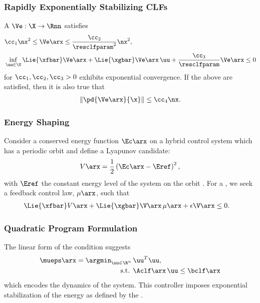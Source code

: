 \begin{frame}[t]
  \frametitle{Rapidly Exponentially Stabilizing CLFs}
  A 
  $\Ve : \X \to \Rnn$ satisfies
  \begin{align*}
    &\cc_{1} \nx^{2} \leq \Ve\arx \leq \frac{\cc_{2}}{\resclfparam^{2}} \nx^{2},\\
    &\inf_{\uu \in \U} \Lie{\xfbar}\Ve\arx + \Lie{\xgbar}\Ve\arx \, \uu +
    \frac{\cc_{3}}{\resclfparam} \Ve\arx \leq 0
  \end{align*}
  for $\cc_{1}, \cc_{2}, \cc_{3} > 0$ exhibits exponential convergence. If the above
  are satisfied, then it is also true that
  \begin{align*}
    \left\| \pd{\Ve\arx}{\x} \right\| \leq \cc_{4} \nx.
  \end{align*}
\end{frame}

\begin{frame}[t]
  \frametitle{Energy Shaping}
  Consider a conserved energy function $\Ec\arx$ on a hybrid control system
  \HCSbar which has a periodic orbit \orbit and define a Lyapunov candidate:
  \begin{align*}
    V\arx = \frac{1}{2} \left(\Ec\arx - \Eref\right)^{2},
  \end{align*}
  with $\Eref$ the constant energy level of the system on the orbit
  \orbit. For a \RESCLF, we seek a feedback control law, $\mu\arx$, such that
  \begin{align*}
    \Lie{\xfbar} V\arx + \Lie{\xgbar} \V\arx \, \mu\arx + \epsilon \V\arx &\leq 0.
  \end{align*}
\end{frame}

\begin{frame}[t]
  \frametitle{Quadratic Program Formulation}
  The linear form of the \RESCLF condition suggests
  \begin{align}
    \nonumber
    \mueps\arx = \argmin_{\uu \in \R^{n}}  \, & \uu^T \uu,\\
    \mbox{s.t. } & \Aclf\arx \, \uu \leq \bclf\arx
  \end{align}
  which encodes the dynamics of the system. This controller imposes exponential
  stabilization of the energy as defined by the \RESCLF.
\end{frame}

